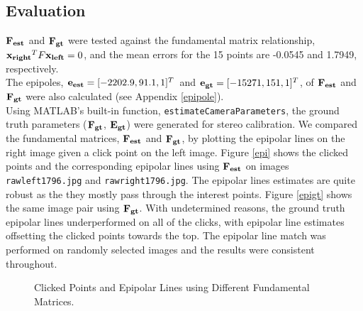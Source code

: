 \documentclass[12pt]{article} %
\begin{document}
\subsection{Evaluation}
${\bf F_{est}}$ and ${\bf F_{gt}}$ were tested against the fundamental matrix relationship, ${\bf x_{right}}^TF{\bf x_{left}} = 0$, and the mean errors for the 15 points are -0.0545 and 1.7949, respectively.\\
The epipoles, ${\bf e_{est}} = [-2202.9, 91.1, 1]^T$ and ${\bf e_{gt}} = [-15271, 151, 1]^T$, of ${\bf F_{est}}$ and ${\bf F_{gt}}$ were also calculated (see Appendix \ref{epipole}).\\
\noindent Using MATLAB's built-in function, {\tt estimateCameraParameters}, the ground truth parameters (${\bf F_{gt}}$, ${\bf E_{gt}}$) were generated for stereo calibration. We compared the fundamental matrices, ${\bf F_{est}}$ and ${\bf F_{gt}}$, by plotting the epipolar lines on the right image given a click point on the left image. Figure \ref{epi} shows the clicked points and the corresponding epipolar lines using ${\bf F_{est}}$ on images {\tt rawleft1796.jpg} and {\tt rawright1796.jpg}. The epipolar lines estimates are quite robust as the they mostly pass through the interest points. Figure \ref{epigt} shows the same image pair using ${\bf F_{gt}}$. With undetermined reasons, the ground truth epipolar lines underperformed on all of the clicks, with epipolar line estimates offsetting the clicked points towards the top. The epipolar line match was performed on randomly selected images and the results were consistent throughout.\\

\begin{figure}[h!]
	\centering

	\caption{Clicked Points and Epipolar Lines using Different Fundamental Matrices.}
\end{figure}
\end{document}
